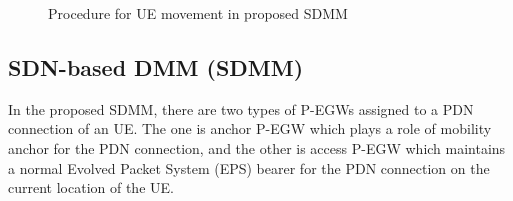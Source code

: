 \documentclass[runningheads,a4paper]{llncs}
\begin{document}
\begin{figure}[t]
\centering 
{}
\vspace{-0.3cm}
\caption{Procedure for UE movement in proposed SDMM}
\label{fig:2}\vspace{-0.6cm}
\end{figure}

\subsection{SDN-based DMM (SDMM)}
\vspace{-0.3cm}
In the proposed SDMM, there are two types of P-EGWs assigned to a PDN connection of an UE. The one is anchor P-EGW which plays a role of mobility anchor for the PDN connection, and the other is access P-EGW which maintains a normal Evolved Packet System (EPS) bearer for the PDN connection on the current location of the UE. 
\end{document}
